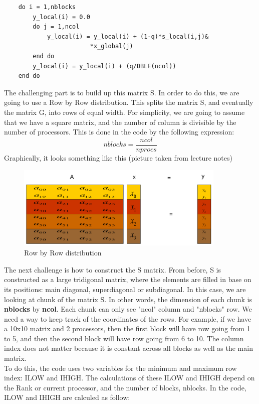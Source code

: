 \documentclass[12pt]{article}
\begin{document}
    \begin{lstlisting}
    do i = 1,nblocks
        y_local(i) = 0.0
        do j = 1,ncol
            y_local(i) = y_local(i) + (1-q)*s_local(i,j)&
                        *x_global(j)       
        end do
        y_local(i) = y_local(i) + (q/DBLE(ncol))
    end do        
    \end{lstlisting}
    \noindent
    The challenging part is to build up this matrix S. In order to do this, we are going to use a Row by Row distribution.  This splits the matrix S, and eventually the matrix G, into rows of equal width.  For simplicity, we are going to assume that we have a square matrix, and the number of column is divisible by the number of processors.  This is done in the code by the following expression: 
    \begin{equation}
        nblocks = \dfrac{ncol}{nprocs} 
    \end{equation}
    \noindent
    Graphically, it looks something like this (picture taken from lecture notes)
    \begin{figure}[H]
		\hfill\includegraphics[width=100mm,height= 40mm]{rowbyrow.png}\hspace*{\fill}
		\caption{Row by Row distribution}
    \end{figure}
    \noindent
    The next challenge is how to construct the S matrix.  From before, S is constructed as a large tridigonal matrix, where the elements are filled in base on its positions: main diagonal, superdiagonal or subdiagonal. In this case, we are looking at chunk of the matrix S.  In other words, the dimension of each chunk is \textbf{nblocks} by \textbf{ncol}.  Each chunk can only see "ncol" column and "nblocks" row. We need a way to keep track of the coordinates of the rows. For example, if we have a 10x10 matrix and 2 processors, then the first block will have row going from 1 to 5, and then the second block will have row going from 6 to 10. The column index does not matter because it is constant across all blocks as well as the main matrix.\\

    \noindent
    To do this, the code uses two variables for the minimum and maximum row index: ILOW and IHIGH. The calculations of these ILOW and IHIGH depend on the Rank or current processor, and the number of blocks, nblocks. In the code, ILOW and IHIGH are calculed as follow:
\end{document}
